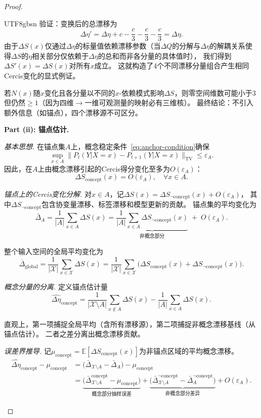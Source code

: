 \documentclass[12pt,a4paper]{article}
\newcommand{\E}{\mathbb{E}}
\newcommand{\cX}{\mathcal{X}}
\newcommand{\TV}{\mathrm{TV}}
\begin{document}
\begin{proof}
\begin{CJK}{UTF8}{gbsn}
验证：变换后的总漂移为
\[
\Delta\eta' = \Delta\eta + c - \frac{c}{3} - \frac{c}{3} - \frac{c}{3} = \Delta\eta.
\]
由于$\Delta S(x)$仅通过$\Delta\eta$的标量值依赖漂移参数（当$\Delta Q$的分解与$\Delta\eta$的解耦关系使得$\Delta S$的$\eta$相关部分仅依赖于$\Delta\eta$的总和而非各分量的具体值时），
我们得到$\Delta S'(x) = \Delta S(x)$对所有$x$成立。
这就构造了4个不同漂移分量组合产生相同Cercis变化的显式例证。

若$N(x)$随$x$变化且各分量以不同的$x$-依赖模式影响$\Delta S$，则零空间维数可能小于3但仍然$\ge 1$（因为四维$\to$一维可观测量的映射必有三维核）。
最终结论：不引入额外信息（如锚点），四个漂移源不可区分。

\medskip\noindent
\textbf{Part (ii): 锚点估计.}

\emph{基本思想.} 在锚点集$A$上，概念稳定条件~\eqref{eq:anchor-condition}确保
\[
\sup_{x\in A} \|P_t(Y|X=x) - P_{t+1}(Y|X=x)\|_{\TV} \le \varepsilon_A.
\]
因此，在$A$上由概念漂移引起的Cercis得分变化至多为$O(\varepsilon_A)$：
\[
\Delta S_{\text{concept}}(x) = O(\varepsilon_A),\quad \forall x \in A.
\]

\emph{锚点上的Cercis变化分解.}
对$x \in A$，记$\Delta S(x) = \Delta S_{\neg\text{concept}}(x) + O(\varepsilon_A)$，
其中$\Delta S_{\neg\text{concept}}$包含协变量漂移、标签漂移和模型更新的贡献。
锚点集的平均变化为
\[
\bar\Delta_{A} = \frac{1}{|A|}\sum_{x\in A} \Delta S(x)
= \underbrace{\frac{1}{|A|}\sum_{x\in A} \Delta S_{\neg\text{concept}}(x)}_{\text{非概念部分}}
\;+\; O(\varepsilon_A).
\]

整个输入空间的全局平均变化为
\[
\bar\Delta_{\text{global}} = \frac{1}{|\cX|}\sum_{x\in\cX} \Delta S(x)
= \frac{1}{|\cX|}\sum_{x\in\cX}
\bigl(\Delta S_{\text{concept}}(x) + \Delta S_{\neg\text{concept}}(x)\bigr).
\]

\emph{概念分量的分离.}
定义锚点估计量
\[
\widehat{\Delta\eta}_{\text{concept}}
= \frac{1}{|\cX \setminus A|}\sum_{x\notin A} \Delta S(x)
- \frac{1}{|A|}\sum_{x\in A} \Delta S(x).
\]

直观上，第一项捕捉全局平均（含所有漂移源），第二项捕捉非概念漂移基线（从锚点估计）。
二者之差分离出概念漂移贡献。

\emph{误差界推导.}
记$\mu_{\text{concept}} = \E[\Delta S_{\text{concept}}(x)]$为非锚点区域的平均概念漂移。
\[
\begin{aligned}
\widehat{\Delta\eta}_{\text{concept}} - \mu_{\text{concept}}
&= \bigl(\bar\Delta_{\cX\setminus A} - \bar\Delta_A\bigr) - \mu_{\text{concept}} \\
&= \underbrace{\bigl(\bar\Delta^{\text{concept}}_{\cX\setminus A} - \mu_{\text{concept}}\bigr)}_{\text{概念部分抽样误差}}
+ \underbrace{\bigl(\bar\Delta^{\neg\text{concept}}_{\cX\setminus A} -
\bar\Delta^{\neg\text{concept}}_A\bigr)}_{\text{非概念部分差异}}
+ O(\varepsilon_A).
\end{aligned}
\]


\end{CJK}
\end{proof}
\end{document}
